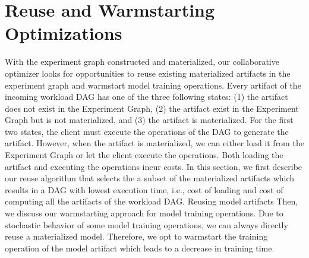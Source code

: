 \section{Reuse and Warmstarting Optimizations}\label{sec-reuse-and-warmstarting}
With the experiment graph constructed and materialized, our collaborative optimizer looks for opportunities to reuse existing materialized artifacts in the experiment graph and warmstart model training operations.
Every artifact of the incoming workload DAG has one of the three following states: (1) the artifact does not exist in the Experiment Graph, (2) the artifact exist in the Experiment Graph but is not materialized, and (3) the artifact is materialized.
For the first two states, the client must execute the operations of the DAG to generate the artifact.
However, when the artifact is materialized, we can either load it from the Experiment Graph or let the client execute the operations.
Both loading the artifact and executing the operations incur costs.
In this section, we first describe our reuse algorithm that selects the a subset of the materialized artifacts which results in a DAG with lowest execution time, i.e., cost of loading and cost of computing all the artifacts of the workload DAG.
Reusing model artifacts 
Then, we discuss our warmstarting approach for model training operations.
Due to stochastic behavior of some model training operations, we can always directly reuse a materialized model.
Therefore, we opt to warmstart the training operation of the model artifact which leads to a decrease in training time.


